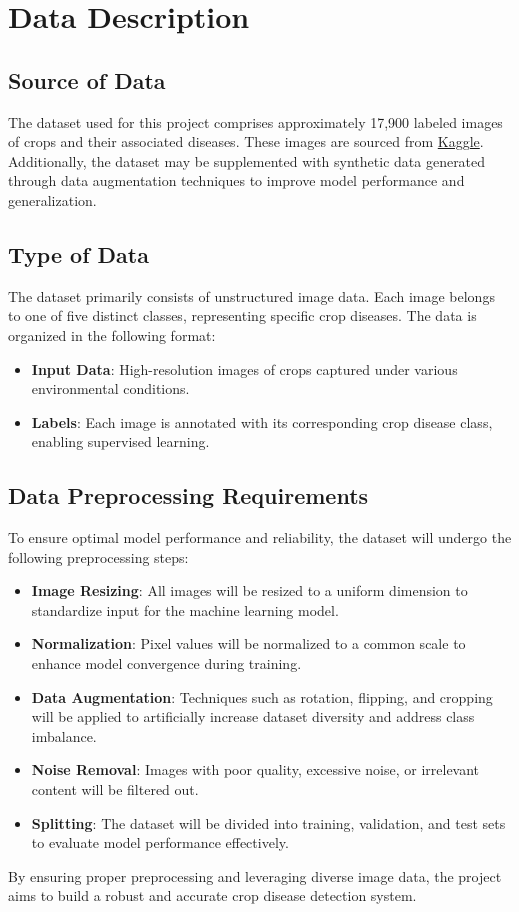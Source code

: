 \section{Data Description}
\subsection{Source of Data}
The dataset used for this project comprises approximately 17,900 labeled images of crops and their associated diseases. These images are sourced from \href{https://www.kaggle.com/datasets/mexwell/crop-diseases-classification}{Kaggle}. Additionally, the dataset may be supplemented with synthetic data generated through data augmentation techniques to improve model performance and generalization.



\subsection{Type of Data}
The dataset primarily consists of unstructured image data. Each image belongs to one of five distinct classes, representing specific crop diseases. The data is organized in the following format:
\begin{itemize}
    \item \textbf{Input Data}: High-resolution images of crops captured under various environmental conditions.
    \item \textbf{Labels}: Each image is annotated with its corresponding crop disease class, enabling supervised learning.
\end{itemize}

\subsection{Data Preprocessing Requirements}
To ensure optimal model performance and reliability, the dataset will undergo the following preprocessing steps:
\begin{itemize}
    \item \textbf{Image Resizing}: All images will be resized to a uniform dimension to standardize input for the machine learning model.
    \item \textbf{Normalization}: Pixel values will be normalized to a common scale to enhance model convergence during training.
    \item \textbf{Data Augmentation}: Techniques such as rotation, flipping, and cropping will be applied to artificially increase dataset diversity and address class imbalance.
    \item \textbf{Noise Removal}: Images with poor quality, excessive noise, or irrelevant content will be filtered out.
    \item \textbf{Splitting}: The dataset will be divided into training, validation, and test sets to evaluate model performance effectively.
\end{itemize}

By ensuring proper preprocessing and leveraging diverse image data, the project aims to build a robust and accurate crop disease detection system.
